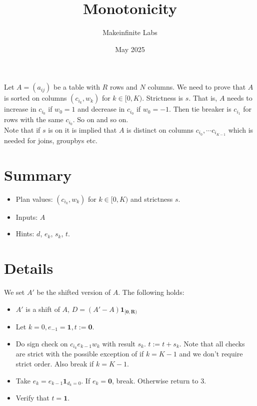 \documentclass[11pt]{article}
\title{Monotonicity}
\author{Makeinfinite Labs}
\date{May 2025}
\begin{document}
\maketitle

\noindent Let $A=(a_{ij})$ be a table with $R$ rows and $N$ columns. We need to prove that $A$ is sorted on columns $(c_{i_k}, w_k)$ for $k \in [0, K)$. Strictness is $s$. That is, $A$ needs to increase in $c_{i_0}$ if $w_0 = 1$ and decrease in $c_{i_0}$ if $w_0 = -1$. Then tie breaker is $c_{i_1}$ for rows with the same $c_{i_0}$. So on and so on.\\
Note that if $s$ is on it is implied that $A$ is distinct on columns $c_{i_0}, \cdots c_{i_{K-1}}$ which is needed for joins, groupbys etc.\\

\section{Summary}
\begin{itemize}
    \item Plan values: $(c_{i_k}, w_k)$ for $k \in [0, K)$ and strictness $s$.
    \item Inputs: $A$
    \item Hints: $d$, $e_k$, $s_k$, $t$.
\end{itemize}

\section{Details}
We set $A'$ be the shifted version of $A$. The following holds:\\
\begin{itemize}
    \item $A'$ is a shift of $A$, $D = (A' - A)\mathbf{1_{[0, R)}}$
    \item Let $k = 0, e_{-1} = \mathbf{1}, t:=\mathbf{0}$.
    \item Do sign check on $c_{i_k}e_{k-1}w_k$ with result $s_k$. $t:=t+s_k$. Note that all checks are strict with the possible exception of if $k = K - 1$ and we don't require strict order. Also break if $k = K - 1$.
    \item Take $e_k = e_{k-1}\mathbf{1}_{d_k = 0}$. If $e_k = \mathbf{0}$, break. Otherwise return to 3.
    \item Verify that $t = \mathbf{1}$.
\end{itemize}
\end{document}
